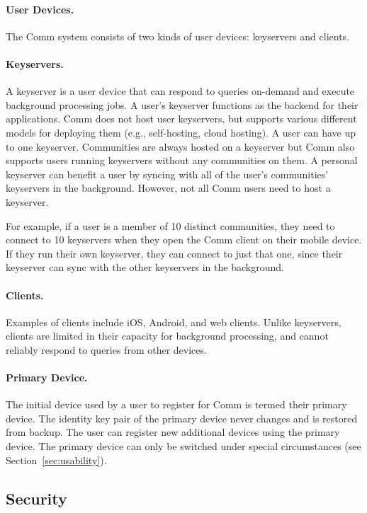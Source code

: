 \documentclass{article}
\begin{document}
\paragraph{User Devices.} The Comm system consists of two kinds of user devices: keyservers and clients.

\paragraph{Keyservers.} A keyserver is a user device that can respond to queries on-demand and execute background processing jobs. A user's keyserver functions as the backend for their applications. Comm does not host user keyservers, but supports various different models for deploying them (e.g., self-hosting, cloud hosting). A user can have up to one keyserver. Communities are always hosted on a keyserver but Comm also supports users running keyservers without any communities on them. A personal keyserver can benefit a user by syncing with all of the user's communities' keyservers in the background. However, not all Comm users need to host a keyserver.

For example, if a user is a member of 10 distinct communities, they need to connect to 10 keyservers when they open the Comm client on their mobile device. If they run their own keyserver, they can connect to just that one, since their keyserver can sync with the other keyservers in the background.

\paragraph{Clients.} Examples of clients include iOS, Android, and web clients. Unlike keyservers, clients are limited in their capacity for background processing, and cannot reliably respond to queries from other devices.

\paragraph{Primary Device.} The initial device used by a user to register for Comm is termed their primary device. The identity key pair of the primary device never changes and is restored from backup. The user can register new additional devices using the primary device. The primary device can only be switched under special circumstances (see Section~\ref{sec:usability}).


\subsection{Security}
\end{document}
